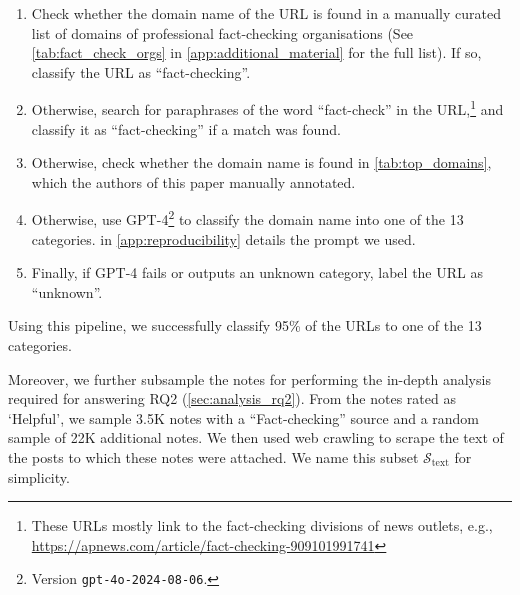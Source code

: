 \begin{enumerate}[topsep=0pt,itemsep=-1ex,partopsep=1ex,parsep=1ex] %
    \item Check whether the domain name of the URL is found in a manually curated list of domains of professional fact-checking organisations (See \cref{tab:fact_check_orgs} in \cref{app:additional_material} for the full list). If so, classify the URL as ``fact-checking''.
    \item Otherwise, search for paraphrases of the word ``fact-check'' in the URL,\footnote{These URLs mostly link to the fact-checking divisions of news outlets, e.g., \url{https://apnews.com/article/fact-checking-909101991741}} and classify it as ``fact-checking'' if a match was found.
    \item Otherwise, check whether the domain name is found in \cref{tab:top_domains}, which the authors of this paper manually annotated.
    \item Otherwise, use GPT-4\footnote{Version \texttt{gpt-4o-2024-08-06}.} to classify the domain name into one of the 13 categories.  in \cref{app:reproducibility} details the prompt we used. 
    \item Finally, if  GPT-4 fails or outputs an unknown category, label the URL as ``unknown''.
\end{enumerate}

\noindent Using this pipeline, we successfully classify 95\% of the URLs to one of the 13 categories. 


Moreover, we further subsample the notes for performing the in-depth analysis required for answering RQ2 (\cref{sec:analysis_rq2}). From the notes rated as `Helpful', we sample 3.5K notes with a ``Fact-checking'' source and a random sample of 22K additional notes. We then used web crawling to scrape the text of the posts to which these notes were attached. We name this subset $\mathcal{S}_\text{text}$ for simplicity.




